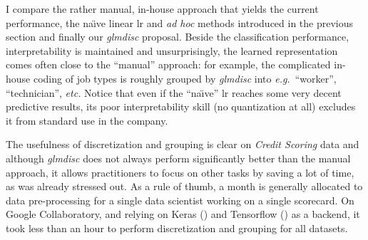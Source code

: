 I compare the rather manual, in-house approach that yields the current performance, the na\"{\i}ve linear \gls{lr} and \textit{ad hoc} methods introduced in the previous section and finally our \textit{glmdisc} proposal. Beside the classification performance, interpretability is maintained and unsurprisingly, the learned representation comes often close to the ``manual'' approach: for example, the complicated in-house coding of job types is roughly grouped by \textit{glmdisc} into \textit{e.g.}\ ``worker'', ``technician'', \textit{etc.} Notice that even if the ``na\"{\i}ve'' \gls{lr} reaches some very decent predictive results, its poor interpretability skill (no quantization at all) excludes it from standard use in the company.

The usefulness of discretization and grouping is clear on \textit{Credit Scoring} data and although \textit{glmdisc} does not always perform significantly better than the manual approach, it allows practitioners to focus on other tasks by saving a lot of time, as was already stressed out. As a rule of thumb, a month is generally allocated to data pre-processing for a single data scientist working on a single scorecard. On Google Collaboratory, and relying on Keras (\cite{chollet2015keras}) and Tensorflow (\cite{tensorflow2015-whitepaper}) as a backend, it took less than an hour to perform discretization and grouping for all datasets.




